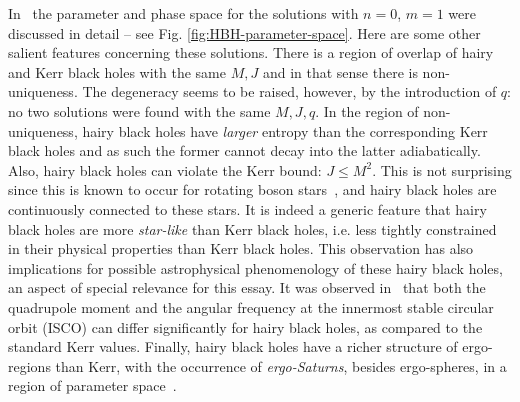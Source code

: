 In~\cite{Herdeiro:2014goa} the parameter and phase space for the solutions with $n=0$, $m=1$ were discussed in detail -- see Fig. \ref{fig:HBH-parameter-space}.
Here are some other salient features concerning these solutions.
There is a region of overlap of hairy and Kerr black holes with the same $M,J$ and in that sense there is non-uniqueness.
The degeneracy seems to be raised, however, by the introduction of $q$: no two solutions were found with the same $M,J,q$.
In the region of non-uniqueness, hairy black holes have \textit{larger} entropy than the corresponding Kerr black holes and as such the former cannot decay into the latter adiabatically.
Also, hairy black holes can violate the Kerr bound: $J\le M^2$.
This is not surprising since this is known to occur for rotating boson stars~\cite{Ryan:1996nk}, and hairy black holes are continuously connected to these stars.
It is indeed a generic feature that hairy black holes are more \textit{star-like} than Kerr black holes, i.e. less tightly constrained in their physical properties than Kerr black holes.
This observation has also implications for possible astrophysical phenomenology of these hairy black holes, an aspect of special relevance for this essay.
It was observed in~\cite{Herdeiro:2014goa} that both the quadrupole moment and the angular frequency at the innermost stable circular orbit (ISCO) can differ significantly for hairy black holes, as compared to the standard Kerr values.
Finally, hairy black holes have a richer structure of ergo-regions than Kerr, with the occurrence of \textit{ergo-Saturns}, besides ergo-spheres, in a region of parameter space~\cite{Herdeiro:2014jaa}.

